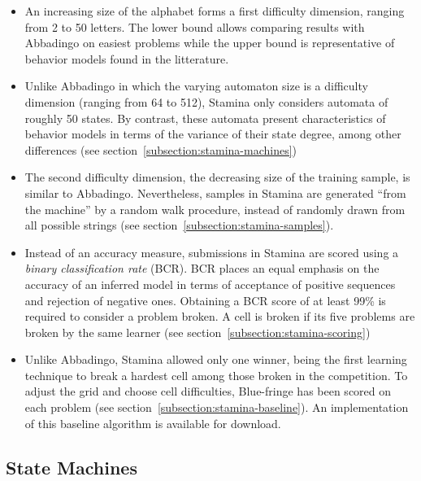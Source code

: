 \begin{itemize}

\item An increasing size of the alphabet forms a first difficulty dimension, ranging from 2 to 50 letters. The lower bound allows comparing results with Abbadingo on easiest problems while the upper bound is representative of behavior models found in the litterature.

\item Unlike Abbadingo in which the varying automaton size is a difficulty dimension (ranging from 64 to 512), Stamina only considers automata of roughly 50 states. By contrast, these automata present characteristics of behavior models in terms of the variance of their state degree, among other differences (see section~\ref{subsection:stamina-machines})

\item The second difficulty dimension, the decreasing size of the training sample, is similar to Abbadingo. Nevertheless, samples in Stamina are generated ``from the machine'' by a random walk procedure, instead of randomly drawn from all possible strings (see section~\ref{subsection:stamina-samples}).

\item Instead of an accuracy measure, submissions in Stamina are scored using a \emph{binary classification rate} (BCR). BCR places an equal emphasis on the accuracy of an inferred model in terms of acceptance of positive sequences and rejection of negative ones. Obtaining a BCR score of at least 99\% is required to consider a problem broken. A cell is broken if its five problems are broken by the same learner (see section~\ref{subsection:stamina-scoring})

\item Unlike Abbadingo, Stamina allowed only one winner, being the first learning technique to break a hardest cell among those broken in the competition. To adjust the grid and choose cell difficulties, Blue-fringe has been scored on each problem (see section~\ref{subsection:stamina-baseline}). An implementation of this baseline algorithm is available for download.

\end{itemize}

\subsection{State Machines\label{subsection:stamina-machines}}

